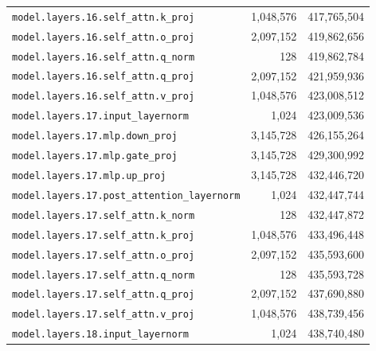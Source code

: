 \documentclass[10pt,a4paper]{article}
\theoremstyle{definition}
\begin{document}
\begin{appendices}
\begin{longtable}{p{9.5cm}rr}
\texttt{model.\allowbreak{}layers.\allowbreak{}16.\allowbreak{}self\_attn.\allowbreak{}k\_proj} & 1,048,576 & 417,765,504 \\
\texttt{model.\allowbreak{}layers.\allowbreak{}16.\allowbreak{}self\_attn.\allowbreak{}o\_proj} & 2,097,152 & 419,862,656 \\
\texttt{model.\allowbreak{}layers.\allowbreak{}16.\allowbreak{}self\_attn.\allowbreak{}q\_norm} & 128 & 419,862,784 \\
\texttt{model.\allowbreak{}layers.\allowbreak{}16.\allowbreak{}self\_attn.\allowbreak{}q\_proj} & 2,097,152 & 421,959,936 \\
\texttt{model.\allowbreak{}layers.\allowbreak{}16.\allowbreak{}self\_attn.\allowbreak{}v\_proj} & 1,048,576 & 423,008,512 \\
\texttt{model.\allowbreak{}layers.\allowbreak{}17.\allowbreak{}input\_layernorm} & 1,024 & 423,009,536 \\
\texttt{model.\allowbreak{}layers.\allowbreak{}17.\allowbreak{}mlp.\allowbreak{}down\_proj} & 3,145,728 & 426,155,264 \\
\texttt{model.\allowbreak{}layers.\allowbreak{}17.\allowbreak{}mlp.\allowbreak{}gate\_proj} & 3,145,728 & 429,300,992 \\
\texttt{model.\allowbreak{}layers.\allowbreak{}17.\allowbreak{}mlp.\allowbreak{}up\_proj} & 3,145,728 & 432,446,720 \\
\texttt{model.\allowbreak{}layers.\allowbreak{}17.\allowbreak{}post\_attention\_layernorm} & 1,024 & 432,447,744 \\
\texttt{model.\allowbreak{}layers.\allowbreak{}17.\allowbreak{}self\_attn.\allowbreak{}k\_norm} & 128 & 432,447,872 \\
\texttt{model.\allowbreak{}layers.\allowbreak{}17.\allowbreak{}self\_attn.\allowbreak{}k\_proj} & 1,048,576 & 433,496,448 \\
\texttt{model.\allowbreak{}layers.\allowbreak{}17.\allowbreak{}self\_attn.\allowbreak{}o\_proj} & 2,097,152 & 435,593,600 \\
\texttt{model.\allowbreak{}layers.\allowbreak{}17.\allowbreak{}self\_attn.\allowbreak{}q\_norm} & 128 & 435,593,728 \\
\texttt{model.\allowbreak{}layers.\allowbreak{}17.\allowbreak{}self\_attn.\allowbreak{}q\_proj} & 2,097,152 & 437,690,880 \\
\texttt{model.\allowbreak{}layers.\allowbreak{}17.\allowbreak{}self\_attn.\allowbreak{}v\_proj} & 1,048,576 & 438,739,456 \\
\texttt{model.\allowbreak{}layers.\allowbreak{}18.\allowbreak{}input\_layernorm} & 1,024 & 438,740,480 \\

\end{longtable}
\end{appendices}
\end{document}
